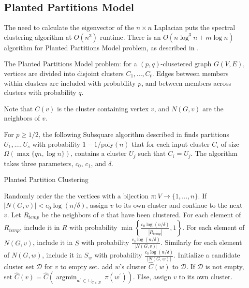 {	\subsection{Planted Partitions Model}
	
	The need to calculate the eigenvector of the $n\times n$ Laplacian puts the spectral clustering algorithm at $O(n^3)$ runtime. There is an $O(n \log^3 n + m \log n)$ algorithm for Planted Partitions Model problem, as described in \cite{bsh10}.
	
	The Planted Partitions Model problem: for a $(p,q)$-clusetered graph $G(V,E)$, vertices are divided into disjoint clusters $C_1, \ldots, C_t$. Edges between members within clusters are included with probability $p$, and between members across clusters with probability $q$.
	
	Note that $C(v)$ is the cluster containing vertex $v$, and $N(G,v)$ are the neighbors of $v$.
	
	For $p \geq 1/2$, the following Subsquare algorithm described in \cite{bsh10} finds partitions $U_1, \ldots, U_s$ with probability $1-1/\mathrm{poly}(n)$ that for each input cluster $C_i$ of size $\Omega(\max \{qn, \log n \})$, contains a cluster $U_j$ such that $C_i=U_j$. The algorithm takes three parameters, $c_0$, $c_1$, and $\delta$.
	
	\begin{algorithm}
		\caption{Planted Partition Clustering}
		\begin{algorithmic}
			\STATE Randomly order the the vertices with a bijection $\pi : V \rightarrow \{1, \ldots, n\}$.
			\STATE If $|N(G,v)|<c_0 \log(n/\delta)$, assign $v$ to its own cluster and continue to the next $v$.
			\STATE Let $R_{temp}$ be the neighbors of $v$ that have been clustered.
			\STATE For each element of $R_{temp}$, include it in $R$ with probability $\min \left\{\frac{c_{0} \log (n / \delta)}{\left|R_{t e m p}\right|}, 1\right\}$.
			\STATE For each element of $N(G,v)$, include it in $S$ with probability $\frac{c_{0} \log (n / \delta)}{|N(G, v)|}$. Similarly for each element of $N(G,w)$, include it in $S_w$ with probability $\frac{c_{0} \log (n / \delta)}{|N(G, w)|}$.
			\STATE Initialize a candidate cluster set $\mathcal{D}$ for $v$ to empty set.
					\STATE add $w$'s cluster $\hat{C}(w)$ to $\mathcal{D}$.
				\ENDIF
			\ENDFOR
			\ENDFOR
			\STATE If $\mathcal{D}$ is not empty, set $\hat{C}(v)=\hat{C}\left(\operatorname{argmin}_{w^{\prime} \in \cup_{C \in \mathcal{D}}} \pi\left(w^{\prime}\right)\right)$. Else, assign $v$ to its own cluster.
		\end{algorithmic}
	\end{algorithm}
	
}
